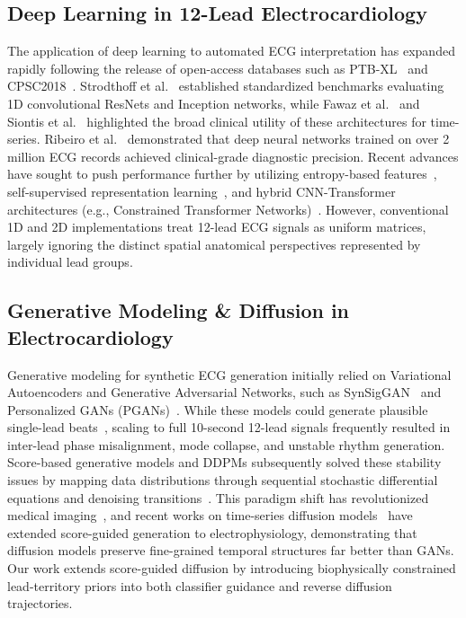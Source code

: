 \documentclass[12pt]{elsarticle}
\begin{document}
\subsection{Deep Learning in 12-Lead Electrocardiology}
The application of deep learning to automated ECG interpretation has expanded rapidly following the release of open-access databases such as PTB-XL~\cite{wagner2020ptb} and CPSC2018~\cite{liu2018open}. Strodthoff et al.~\cite{strodthoff2020deep} established standardized benchmarks evaluating 1D convolutional ResNets and Inception networks, while Fawaz et al.~\cite{fawaz2019deep} and Siontis et al.~\cite{siontis2021artificial} highlighted the broad clinical utility of these architectures for time-series. Ribeiro et al.~\cite{ribeiro2020automatic} demonstrated that deep neural networks trained on over 2 million ECG records achieved clinical-grade diagnostic precision. Recent advances have sought to push performance further by utilizing entropy-based features~\cite{smigiel2021ecg}, self-supervised representation learning~\cite{mehari2022self}, and hybrid CNN-Transformer architectures (e.g., Constrained Transformer Networks)~\cite{che2021constrained}. However, conventional 1D and 2D implementations treat 12-lead ECG signals as uniform matrices, largely ignoring the distinct spatial anatomical perspectives represented by individual lead groups.

\subsection{Generative Modeling \& Diffusion in Electrocardiology}
Generative modeling for synthetic ECG generation initially relied on Variational Autoencoders and Generative Adversarial Networks, such as SynSigGAN~\cite{hazra2020synsiggan} and Personalized GANs (PGANs)~\cite{golany2020pgans}. While these models could generate plausible single-lead beats~\cite{dempsey2022generative}, scaling to full 10-second 12-lead signals frequently resulted in inter-lead phase misalignment, mode collapse, and unstable rhythm generation. Score-based generative models and DDPMs subsequently solved these stability issues by mapping data distributions through sequential stochastic differential equations and denoising transitions~\cite{ho2020denoising, song2020denoising}. This paradigm shift has revolutionized medical imaging~\cite{kazerouni2023diffusion}, and recent works on time-series diffusion models~\cite{neifar2024diffecg} have extended score-guided generation to electrophysiology, demonstrating that diffusion models preserve fine-grained temporal structures far better than GANs. Our work extends score-guided diffusion by introducing biophysically constrained lead-territory priors into both classifier guidance and reverse diffusion trajectories.
\end{document}
